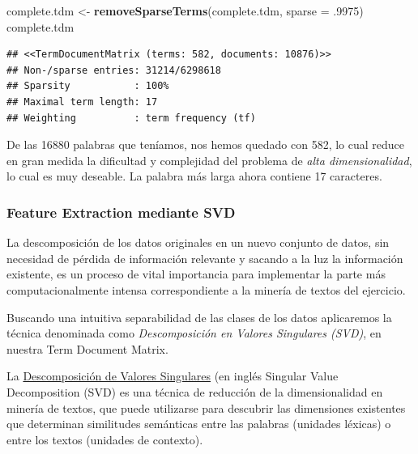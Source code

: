 \documentclass[]{article}
\newenvironment{Shaded}{\begin{snugshade}}{\end{snugshade}}
\newcommand{\DataTypeTok}[1]{\textcolor[rgb]{0.13,0.29,0.53}{#1}}
\newcommand{\FloatTok}[1]{\textcolor[rgb]{0.00,0.00,0.81}{#1}}
\newcommand{\KeywordTok}[1]{\textcolor[rgb]{0.13,0.29,0.53}{\textbf{#1}}}
\newcommand{\NormalTok}[1]{#1}
\newcommand{\StringTok}[1]{\textcolor[rgb]{0.31,0.60,0.02}{#1}}
\begin{document}
\begin{Shaded}
\begin{Highlighting}[]
\NormalTok{complete.tdm <-}\StringTok{ }\KeywordTok{removeSparseTerms}\NormalTok{(complete.tdm, }\DataTypeTok{sparse =} \FloatTok{.9975}\NormalTok{)}
\NormalTok{complete.tdm}
\end{Highlighting}
\end{Shaded}

\begin{verbatim}
## <<TermDocumentMatrix (terms: 582, documents: 10876)>>
## Non-/sparse entries: 31214/6298618
## Sparsity           : 100%
## Maximal term length: 17
## Weighting          : term frequency (tf)
\end{verbatim}

De las 16880 palabras que teníamos, nos hemos quedado con 582, lo cual
reduce en gran medida la dificultad y complejidad del problema de
\emph{alta dimensionalidad}, lo cual es muy deseable. La palabra más larga ahora
contiene 17 caracteres.

\hypertarget{feature-extraction-mediante-singular-value-decomposition}{%
\subsubsection{Feature Extraction mediante SVD}\label{feature-extraction-mediante-singular-value-decomposition}}

La descomposición de los datos originales en un nuevo conjunto de datos, sin
necesidad de pérdida de información relevante y sacando a la luz la
información existente, es un proceso de vital importancia para implementar
la parte más computacionalmente intensa correspondiente a la minería de textos del ejercicio. 

Buscando una intuitiva separabilidad de las clases de los datos aplicaremos la
técnica denominada como \emph{Descomposición en Valores Singulares (SVD)}, en nuestra Term Document Matrix.

\begin{tcolorbox}
	La \href{https://es.wikipedia.org/wiki/Descomposici\%C3\%B3n_en_valores_singulares}{\color{blue}Descomposición de Valores Singulares} (en inglés Singular Value Decomposition (SVD) es una técnica de reducción de la dimensionalidad en minería de textos, que puede utilizarse para descubrir las dimensiones existentes que determinan similitudes semánticas entre las palabras (unidades léxicas) o entre los textos (unidades de	contexto).
\end{tcolorbox}
\end{document}
